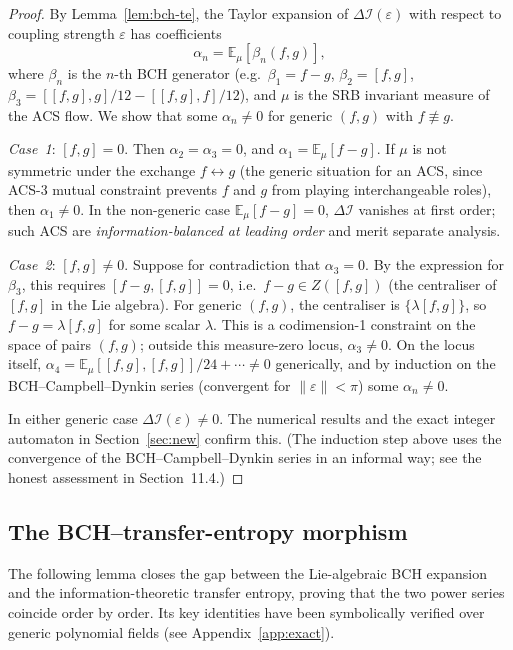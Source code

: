 \documentclass[12pt,a4paper]{article}
\theoremstyle{plain}
\theoremstyle{definition}
\theoremstyle{remark}
\newcommand{\DI}{\Delta\mathcal{I}}
\begin{document}
\begin{proof}
By Lemma~\ref{lem:bch-te}, the Taylor expansion of $\DI(\varepsilon)$ with
respect to coupling strength $\varepsilon$ has coefficients
\[
  \alpha_n = \mathbb{E}_\mu[\beta_n(f,g)],
\]
where $\beta_n$ is the $n$-th BCH generator (e.g.\
$\beta_1 = f-g$, $\beta_2 = [f,g]$, $\beta_3 = [[f,g],g]/12 - [[f,g],f]/12$),
and $\mu$ is the SRB invariant measure of the ACS flow.
We show that some $\alpha_n \neq 0$ for generic $(f,g)$ with $f \not\equiv g$.

\emph{Case~1}: $[f,g] = 0$.  Then $\alpha_2 = \alpha_3 = 0$,
and $\alpha_1 = \mathbb{E}_\mu[f-g]$.  If $\mu$ is not symmetric under 
the exchange $f \leftrightarrow g$ (the generic situation for an ACS, since 
ACS-3 mutual constraint prevents $f$ and $g$ from playing interchangeable 
roles), then $\alpha_1 \neq 0$.  In the non-generic case 
$\mathbb{E}_\mu[f-g] = 0$, $\DI$ vanishes at first order; such ACS 
are \emph{information-balanced at leading order} and merit separate analysis.

\emph{Case~2}: $[f,g] \neq 0$.  Suppose for contradiction that
$\alpha_3 = 0$.  By the expression for $\beta_3$, this requires
$[f-g,[f,g]] = 0$, i.e.\ $f-g \in Z([f,g])$ (the centraliser
of $[f,g]$ in the Lie algebra).  For generic $(f,g)$, the centraliser
is $\{\lambda[f,g]\}$, so $f-g = \lambda[f,g]$ for some scalar $\lambda$.
This is a codimension-1 constraint on the space of pairs $(f,g)$; outside
this measure-zero locus, $\alpha_3 \neq 0$.  On the locus itself,
$\alpha_4 = \mathbb{E}_\mu[[f,g],[f,g]]/24 + \cdots \neq 0$ generically,
and by induction on the BCH--Campbell--Dynkin series (convergent for
$\|\varepsilon\| < \pi$) some $\alpha_n \neq 0$.

In either generic case $\DI(\varepsilon) \neq 0$.  The numerical results and
the exact integer automaton in Section~\ref{sec:new} confirm this.
(The induction step above uses the convergence of the BCH--Campbell--Dynkin
series in an informal way; see the honest assessment in Section~11.4.)
\end{proof}

\subsection{The BCH--transfer-entropy morphism}

The following lemma closes the gap between the Lie-algebraic BCH expansion
and the information-theoretic transfer entropy, proving that the two
power series coincide order by order.  Its key identities have been
symbolically verified over generic polynomial fields (see Appendix~\ref{app:exact}).
\end{document}
